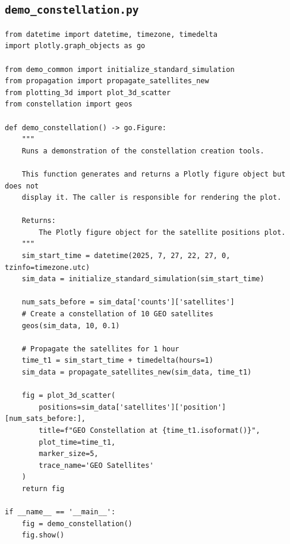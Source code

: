 \documentclass[11pt]{article}
\begin{document}
\subsection{\texttt{demo\_constellation.py}}
\begin{Verbatim}
from datetime import datetime, timezone, timedelta
import plotly.graph_objects as go

from demo_common import initialize_standard_simulation
from propagation import propagate_satellites_new
from plotting_3d import plot_3d_scatter
from constellation import geos

def demo_constellation() -> go.Figure:
    """
    Runs a demonstration of the constellation creation tools.

    This function generates and returns a Plotly figure object but does not
    display it. The caller is responsible for rendering the plot.

    Returns:
        The Plotly figure object for the satellite positions plot.
    """
    sim_start_time = datetime(2025, 7, 27, 22, 27, 0, tzinfo=timezone.utc)
    sim_data = initialize_standard_simulation(sim_start_time)

    num_sats_before = sim_data['counts']['satellites']
    # Create a constellation of 10 GEO satellites
    geos(sim_data, 10, 0.1)

    # Propagate the satellites for 1 hour
    time_t1 = sim_start_time + timedelta(hours=1)
    sim_data = propagate_satellites_new(sim_data, time_t1)

    fig = plot_3d_scatter(
        positions=sim_data['satellites']['position'][num_sats_before:],
        title=f"GEO Constellation at {time_t1.isoformat()}",
        plot_time=time_t1,
        marker_size=5,
        trace_name='GEO Satellites'
    )
    return fig

if __name__ == '__main__':
    fig = demo_constellation()
    fig.show()
\end{Verbatim}
\end{document}
